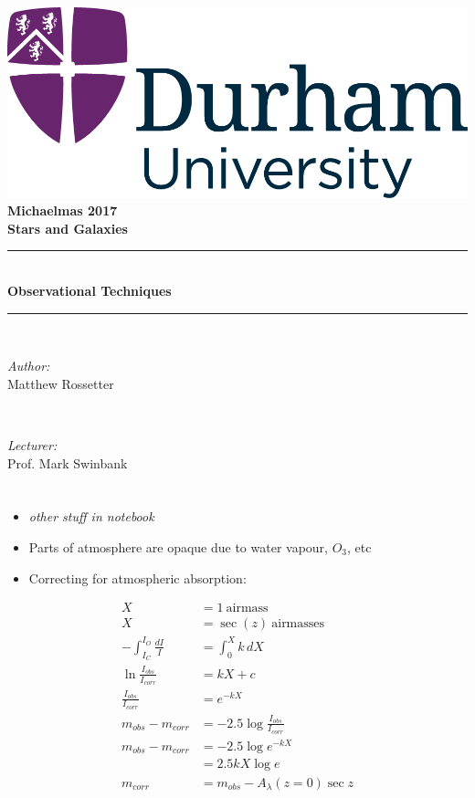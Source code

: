 \documentclass[a4paper,11pt,normalem]{article}
\newcommand{\HRule}{\rule{\linewidth}{0.5mm}}
\begin{document}
{\centering
{\includegraphics[scale=0.5]{../../logo0.png}\hfill{\Large\bfseries Michaelmas 2017}}\\[1.5cm]
{\LARGE\bfseries Stars and Galaxies}\\[0.5cm]
\HRule \\[0.3cm]
{\huge\bfseries Observational Techniques}\\[0.1cm]
\HRule \\[1cm]}
\begin{center}
\begin{minipage}{0.4\textwidth}
    \begin{flushleft} \large
        \emph{Author:} \\ Matthew Rossetter
    \end{flushleft}
\end{minipage}~
\begin{minipage}{0.4\textwidth}
    \begin{flushright} \large
        \emph{Lecturer:} \\ Prof. Mark Swinbank
    \end{flushright}
\end{minipage}
\end{center}

\section{}
\begin{itemize}
    \item \emph{other stuff in notebook}
    \item Parts of atmosphere are opaque due to water vapour, \(O_3\), etc
    \item Correcting for atmospheric absorption:
\end{itemize}

\begin{align*}
    X &= 1 ~\text{airmass} \\
    X &= \sec(z) ~\text{airmasses} \\
    -\int_{I_C}^{I_O} \frac{dI}{I} &= \int_{0}^{X}k\,dX \\
    \ln{\frac{I_{obs}}{I_{corr}}} &= kX + c \\
    \frac{I_{obs}}{I_{corr}} &= e^{-kX} \\
    m_{obs} - m_{corr} &= -2.5\log{\frac{I_{obs}}{I_{corr}}} \\
    m_{obs} - m_{corr} &= -2.5\log{e^{-kX}} \\
                       &= 2.5kX\log{e} \\
    m_{corr} &= m_{obs} - A_\lambda(z = 0) \sec{z}
\end{align*}
\end{document}
